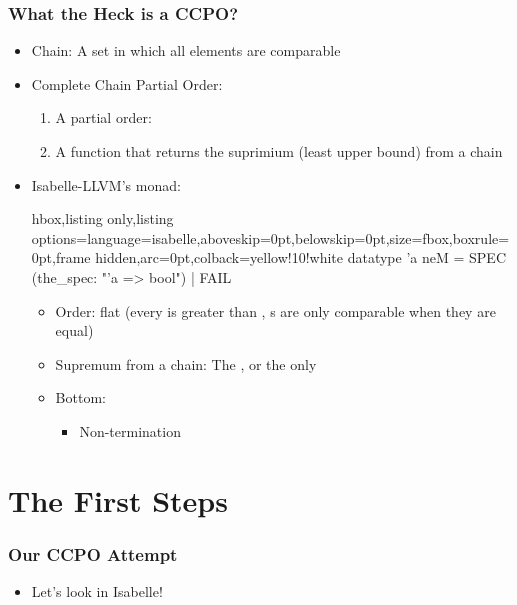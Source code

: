 \documentclass[aspectratio=169,10pt]{beamer}
\begin{document}
\begin{frame}[fragile]
  \frametitle{What the Heck is a CCPO?}
  \begin{itemize}
    \item Chain: A set in which all elements are comparable
    \item Complete Chain Partial Order:
          \begin{enumerate}
            \item A partial order: 
            \item A function that returns the suprimium (least upper bound) from a chain 
          \end{enumerate}
    \pause
    \item Isabelle-LLVM's monad:
          \vspace*{-1ex}
          \begin{tcblisting}{hbox,listing only,listing options={language=isabelle,aboveskip=0pt,belowskip=0pt},size=fbox,boxrule=0pt,frame hidden,arc=0pt,colback=yellow!10!white}
datatype 'a neM = SPEC (the_spec: "'a => bool") | FAIL
          \end{tcblisting}
          \vspace*{-1ex}
          \begin{itemize}
            \item Order: flat (every  is greater than , s are only comparable when they are equal)
            \item Supremum from a chain: The , or the only 
            \item Bottom: 
                  \begin{itemize}
                    \item Non-termination
                  \end{itemize}
          \end{itemize}
  \end{itemize}
\end{frame}

\section{The First Steps}

\begin{frame}[fragile]
  \frametitle{Our CCPO Attempt}
  \begin{itemize}
    \item Let's look in Isabelle!
  \end{itemize}
\end{frame}
\end{document}
